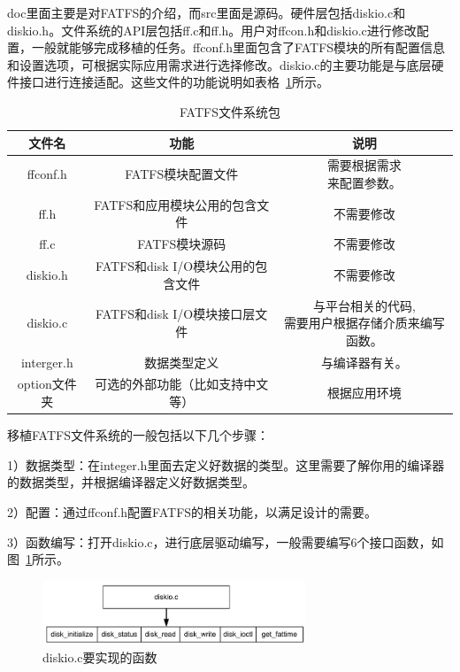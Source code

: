 doc里面主要是对FATFS的介绍，而src里面是源码。硬件层包括diskio.c和diskio.h。文件系统的API层包括ff.c和ff.h。用户对ffcon.h和diskio.c进行修改配置，一般就能够完成移植的任务。ffconf.h里面包含了FATFS模块的所有配置信息和设置选项，可根据实际应用需求进行选择修改。diskio.c的主要功能是与底层硬件接口进行连接适配。这些文件的功能说明如表格~\ref{tab:FATFS文件系统包}所示。
\begin{table}[ht]
\caption{FATFS文件系统包}
  \label{tab:FATFS文件系统包}
\centering
    \begin{tabular}{|c|c|c|}
        \toprule
 {\bf 文件名}&{\bf 功能} & {\bf 说明} \\      
        \hline
 {ffconf.h}&{FATFS模块配置文件} & \tabincell{c}{需要根据需求\\来配置参数。} \\      
        \hline
 {ff.h}&{FATFS和应用模块公用的包含文件} & {不需要修改} \\      
        \hline 
 {ff.c}&{FATFS模块源码} & {不需要修改} \\      
        \hline
 {diskio.h}&{FATFS和disk I/O模块公用的包含文件} & {不需要修改} \\      
        \hline
{diskio.c}&{FATFS和disk I/O模块接口层文件} &\tabincell{c} {与平台相关的代码,\\需要用户根据存储介质来编写函数。} \\ 
        \hline
{interger.h}&{数据类型定义} & {与编译器有关。} \\ 
        \hline
{option文件夹}&{可选的外部功能（比如支持中文等）} & {根据应用环境} \\ 
        \bottomrule
    \end{tabular}
\end{table}

移植FATFS文件系统的一般包括以下几个步骤：

1）数据类型：在integer.h里面去定义好数据的类型。这里需要了解你用的编译器的数据类型，并根据编译器定义好数据类型。

2）配置：通过ffconf.h配置FATFS的相关功能，以满足设计的需要。

3）函数编写：打开diskio.c，进行底层驱动编写，一般需要编写6个接口函数，如图~\ref{fig:diskio.c要实现的函数}所示。
\begin{figure}[ht]
    \centering
	\includegraphics[width=0.7\textwidth]{fig/diskio.c要实现的函数.png}
	\caption{diskio.c要实现的函数}
	\label{fig:diskio.c要实现的函数}
\end{figure}

